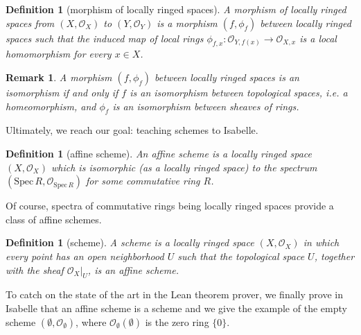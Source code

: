 \documentclass[12pt]{scrartcl}
\newtheorem{definition}[proposition]{Definition}
\newtheorem{remark}[proposition]{Remark}
\def\spec{\text{Spec}\,R}
\begin{document}
\begin{definition}[morphism of locally ringed spaces]
	A morphism of locally ringed spaces from $(X, \mathscr{O}_X)$ to $(Y, \mathscr{O}_Y)$ is a morphism $(f, \phi_f)$ between locally ringed spaces such that the induced map of local rings $\phi_{f, x}: \mathscr{O}_{Y, f(x)} \rightarrow \mathscr{O}_{X, x}$ is a local homomorphism for every $x \in X$.  
\end{definition}


\begin{remark}
	A morphism $(f, \phi_f)$ between locally ringed spaces is an isomorphism if and only if $f$ is an isomorphism between topological spaces, \textit{i.e.} a homeomorphism, and $\phi_f$ is an isomorphism between sheaves of rings.
\end{remark}


Ultimately, we reach our goal: teaching schemes to Isabelle.	

\begin{definition}[affine scheme]
	An affine scheme is a locally ringed space $(X, \mathscr{O}_X)$ which is isomorphic (as a locally ringed space) to the spectrum $(\text{Spec}\,R, \mathscr{O}_{\spec})$ for some commutative ring $R$. 
\end{definition}


Of course, spectra of commutative rings being locally ringed spaces provide a class of affine schemes.


\begin{definition}[scheme]
	A scheme is a locally ringed space $(X, \mathscr{O}_X)$ in which every point has an open neighborhood $U$ such that the topological space $U$, together with the sheaf $\mathscr{O}_X | _U$, is an affine scheme.
\end{definition}


To catch on the state of the art in the Lean theorem prover, we finally prove in Isabelle that an affine scheme is a scheme and we give the example of the empty scheme $(\emptyset, \mathscr{O}_\emptyset)$, where $\mathscr{O}_\emptyset(\emptyset)$ is the zero ring $\lbrace 0 \rbrace$. 
\end{document}

